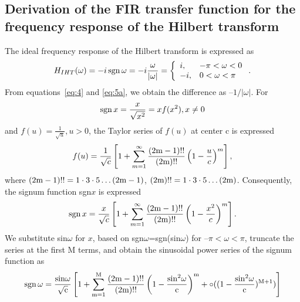 \subsection{Derivation of the FIR transfer function for the frequency response of the Hilbert transform}
The ideal frequency response of the Hilbert transform is expressed as
\begin{equation}
  \label{eq:5a}
  H_{IHT}(\omega)=-i\,{\rm{sgn}}\,\omega=
-i\frac{\omega}{\left|\omega\right|}=\left\{ \begin{array}{ll}
i, & \textrm{$-\pi<\omega<0$}\\
-i, & \textrm{$0<\omega<\pi$}
\end{array} \right.
.
\end{equation}
From equations~\ref{eq:4} and \ref{eq:5a}, we obtain the difference as
$–1/\left|\omega\right|$.  For
\begin{equation}
  \label{eq:6a}
  {\rm{sgn}}\,x=\frac{x}{\sqrt{x^2}}=xf(x^2),x\neq0
\end{equation}
and $f(u)=\displaystyle\frac{1}{\sqrt{u}},u>0$, the Taylor series 
of $f(u)$ at center c is expressed
\begin{equation}
  \label{eq:7a}
  f(u)=\frac{1}{\sqrt{c}}\left[1+\sum_{m=1}^{\infty}
  \frac{(2{\rm{m}}-1)!!}{(2{\rm{m}})!!}\left(1-\frac{u}{c}\right)^m\right],
\end{equation}
where $(2{\rm{m}}-1)!!=1 \cdot 3 \cdot 5 \dots (2 {\rm{m}}- 1)$, $(2{\rm{m}})!!=1\cdot 3\cdot 5\dots(2{\rm{m}})$.
Consequently, the signum function sgn$x$ is expressed
\begin{equation}
  \label{eq:8a}
  {\rm{sgn}}\,x=\frac{x}{\sqrt{c}}\left[1+\sum_{m=1}^{\infty}
  \frac{(2{\rm{m}}-1)!!}{(2{\rm{m}})!!}\left(1-\frac{x^2}{c}\right)^m\right].
\end{equation}
We substitute sin$\omega$ for $x$, based on
sgn$\omega$=sgn(sin$\omega$) for $–\pi<\omega<\pi$, truncate the
series at the first M terms, and obtain the sinusoidal power series of
the signum function as
\begin{equation}
\label{eq:9a}
\rm{sgn}\,\omega=\frac{\rm{sin}\omega}{\sqrt{c}} \left[1+
   \sum_{m=1}^{M}\frac{(2m-1)!!}{(2m)!!}\left(1-\frac{\rm{sin}^2
   \omega}{c}\right)^m+\circ((1-\frac{\rm{sin^2\omega}}{c})^{M+1})\right]
\end{equation}

